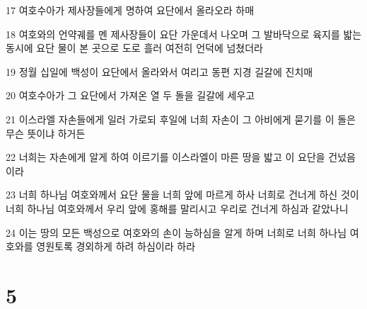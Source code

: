 \par 17 여호수아가 제사장들에게 명하여 요단에서 올라오라 하매
\par 18 여호와의 언약궤를 멘 제사장들이 요단 가운데서 나오며 그 발바닥으로 육지를 밟는 동시에 요단 물이 본 곳으로 도로 흘러 여전히 언덕에 넘쳤더라
\par 19 정월 십일에 백성이 요단에서 올라와서 여리고 동편 지경 길갈에 진치매
\par 20 여호수아가 그 요단에서 가져온 열 두 돌을 길갈에 세우고
\par 21 이스라엘 자손들에게 일러 가로되 후일에 너희 자손이 그 아비에게 묻기를 이 돌은 무슨 뜻이냐 하거든
\par 22 너희는 자손에게 알게 하여 이르기를 이스라엘이 마른 땅을 밟고 이 요단을 건넜음이라
\par 23 너희 하나님 여호와께서 요단 물을 너희 앞에 마르게 하사 너희로 건너게 하신 것이 너희 하나님 여호와께서 우리 앞에 홍해를 말리시고 우리로 건너게 하심과 같았나니
\par 24 이는 땅의 모든 백성으로 여호와의 손이 능하심을 알게 하며 너희로 너희 하나님 여호와를 영원토록 경외하게 하려 하심이라 하라

\chapter{5}

